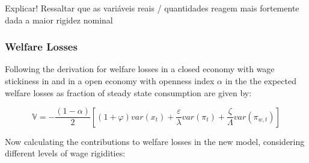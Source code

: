 \documentclass{article}
\begin{document}
\begin{figure}[H]
\centering

\end{figure}

Explicar! Ressaltar que as variáveis reais / quantidades reagem mais fortemente dada a maior rigidez nominal\\

\begin{figure}[H]
\centering

\end{figure}

\subsubsection{Welfare Losses}
Following the derivation for welfare losses in a closed economy with wage stickiness in \citet[Appendix.~6.1]{gali2015} and in a open economy with openness index $\alpha$ in \cite{rhee} the the expected welfare losses as fraction of steady state consumption are given by:

\begin{equation}
    \mathbb V = -\frac{(1-\alpha)}{2} \left[ (1 + \varphi) var(x_t) + \frac{\varepsilon}{\lambda} var(\pi_t) + \frac{\zeta}{\Lambda} var(\pi_{w,t}) \right] 
\end{equation}

Now calculating the contributions to welfare losses in the new model, considering different levels of wage rigidities:
\end{document}
